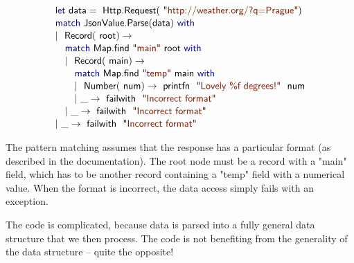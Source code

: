 \documentclass[preprint]{sigplanconf}
\newcommand{\kvd}[1]{\textnormal{\textcolor{kvdclr}{\sffamily #1}}}
\newcommand{\str}[1]{\textnormal{\textcolor{strclr}{\sffamily "#1"}}}
\newcommand{\ident}[1]{\textnormal{\sffamily #1}}
\begin{document}
\noindent
\begin{equation*}
\begin{array}{l}
 \kvd{let}~\ident{data}=\ident{Http.Request}(\str{http://weather.org/?q=Prague}) \\[0.1em]
 \kvd{match}~\ident{JsonValue.Parse}(\ident{data})~\kvd{with} \\[0.1em]
 |~\ident{Record}(\ident{root})\rightarrow \\[0.1em]
 \quad \kvd{match}~\ident{Map.find}~\str{main}~\ident{root}~\kvd{with} \\[0.1em]
 \quad |~\ident{Record}(\ident{main})\rightarrow \\[0.1em]
 \quad \quad \kvd{match}~\ident{Map.find}~\str{temp}~\ident{main}~\kvd{with} \\[0.1em]
 \quad \quad |~\ident{Number}(\ident{num})\rightarrow \ident{printfn}~\str{Lovely \%f degrees!}~\ident{num} \\[0.1em]
 \quad \quad |~\_\rightarrow \ident{failwith}~\str{Incorrect format} \\[0.1em]
 \quad |~\_\rightarrow \ident{failwith}~\str{Incorrect format} \\[0.1em]
 |~\_\rightarrow \ident{failwith}~\str{Incorrect format}
\end{array}
\end{equation*}
\vspace{0.1em}

\noindent
The pattern matching assumes that the response has a
particular format (as described in the documentation). The root node must be a record with a
\str{main} field, which has to be another record containing a \str{temp} field with a numerical
value. When the format is incorrect, the data access simply fails with an exception.

The code is complicated, because data is parsed into a fully general data structure that we then
process. The code is not benefiting from the generality of the data structure -- quite the opposite!
\end{document}
